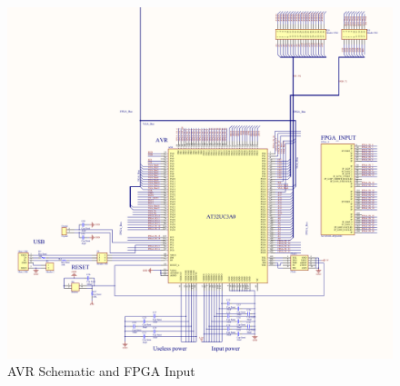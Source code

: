 \begin{figure}[h]
  \centering
  \includegraphics[width=\textwidth]{fig/pcb/schematics/pcbschematic_avr.pdf}
  \caption{AVR Schematic and FPGA Input}
  \label{fig:schematic-pcb-avr}
\end{figure}
